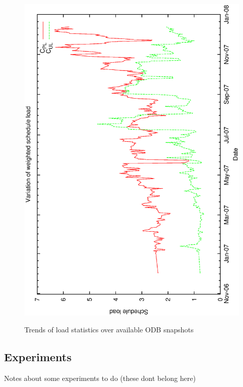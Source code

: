 \begin{figure}[h]
\begin{center}
{   \includegraphics[scale=0.25, angle=-90]{figures/cl_puload.eps}
   \label{fig:db_cl_puload}
 }
\caption{Trends of load statistics over available ODB snapshots}
\end{center}
\end{figure}


\subsection{Experiments}
Notes about some experiments to do (these dont belong here)

